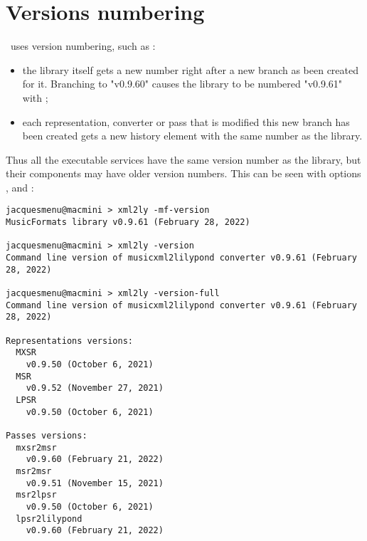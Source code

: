 



\chapter{Versions numbering}\label{Versions numbering}

\mf\ uses  version numbering, such as :%
\begin{itemize}
\item the library itself gets a new number right after a new branch as been created for it. Branching to "v0.9.60" causes the library to be numbered "v0.9.61" with ;

\item each representation, converter or pass that is modified this new branch has been created gets a new history element with the same number as the library.
\end{itemize}

Thus all the executable services have the same version number as the library, but their components may have older version numbers. This can be seen with options ,  and  :
\begin{lstlisting}[language=Terminal]%%%JMI do this again
jacquesmenu@macmini > xml2ly -mf-version
MusicFormats library v0.9.61 (February 28, 2022)

jacquesmenu@macmini > xml2ly -version
Command line version of musicxml2lilypond converter v0.9.61 (February 28, 2022)

jacquesmenu@macmini > xml2ly -version-full
Command line version of musicxml2lilypond converter v0.9.61 (February 28, 2022)

Representations versions:
  MXSR
    v0.9.50 (October 6, 2021)
  MSR
    v0.9.52 (November 27, 2021)
  LPSR
    v0.9.50 (October 6, 2021)

Passes versions:
  mxsr2msr
    v0.9.60 (February 21, 2022)
  msr2msr
    v0.9.51 (November 15, 2021)
  msr2lpsr
    v0.9.50 (October 6, 2021)
  lpsr2lilypond
    v0.9.60 (February 21, 2022)
\end{lstlisting}
